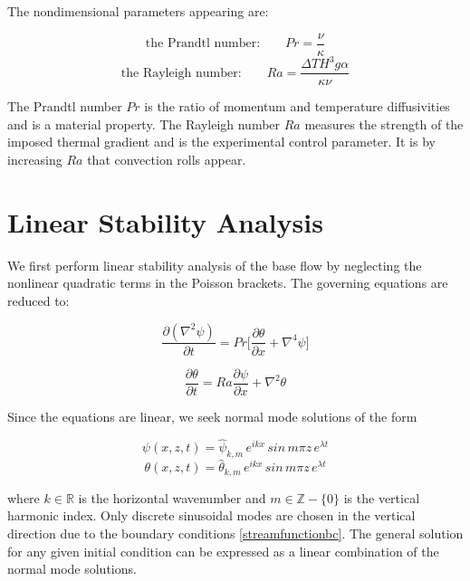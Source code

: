 \documentclass[paper=a4, fontsize=11pt]{scrartcl}
\numberwithin{equation}{section}		%
\numberwithin{figure}{section}			%
\numberwithin{table}{section}				%
\begin{document}
\noindent The nondimensional parameters appearing are:

\begin{equation}
	\text{the Prandtl number:} \qquad Pr = \frac{\nu}{\kappa}
\end{equation}
\begin{equation*}
	\text{the Rayleigh number:} \qquad Ra = \frac{\Delta T H^3 g \alpha}{\kappa \nu}
\end{equation*}

The Prandtl number $Pr$ is the ratio of momentum and temperature diffusivities and is a material property. The Rayleigh number $Ra$ measures the strength of the imposed thermal gradient and is the experimental control parameter. It is by increasing $Ra$ that convection rolls appear.

\section{Linear Stability Analysis}
We first perform linear stability analysis of the base flow by neglecting the nonlinear quadratic terms in the Poisson brackets. The governing equations are reduced to:

\begin{equation}
	\frac{\partial (\nabla^2 \psi)}{\partial t} = Pr \biggl[\frac{\partial \theta}{\partial x} + \nabla^4 \psi\biggr]
	\label{linearstreamfunctioneqn}
\end{equation}	 

\begin{equation}
	\frac{\partial \theta}{\partial t} = Ra \frac{\partial\psi}{\partial x} +  \nabla^2 \theta 
	\label{lineartemperatureeqn}
\end{equation}

\noindent Since the equations are linear, we seek normal mode solutions of the form 

\begin{equation}
	\psi(x,z,t) = \hat{\psi}_{k,m} \, e^{ikx} \, sin \, m \pi z \, e^{\lambda t}
\end{equation}
\begin{equation}
	\theta(x,z,t) = \hat{\theta}_{k,m} \, e^{ikx} \, sin \, m \pi z \, e^{\lambda t}
\end{equation}

where $k \in \mathbb{R}$ is the horizontal wavenumber and $m \in \mathbb{Z} - \{0\}$ is the vertical harmonic index. Only discrete sinusoidal modes are chosen in the vertical direction due to the boundary conditions \ref{streamfunctionbc}. The general solution for any given initial condition can be expressed as a linear combination of the normal mode solutions. \\
\end{document}

